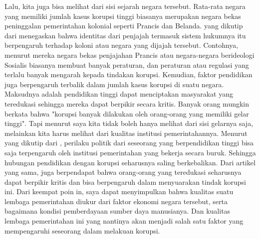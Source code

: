 \documentclass[11pt]{article}
\begin{document}
Lalu, kita juga bisa melihat dari sisi sejarah negara tersebut. Rata-rata negara
yang memiliki jumlah kasus korupsi tinggi biasanya merupakan negara bekas peninggalan
pemerintahan kolonial seperti Prancis dan Belanda. \citet*{laportaQualityGovernment1999}
yang dikutip dari \citet*{svenssonEightQuestionsCorruption2005} menegaskan bahwa 
identitas dari penjajah termasuk sistem hukumnya itu berpengaruh terhadap koloni 
atau negara yang dijajah tersebut. Contohnya, menurut mereka negara bekas penjajahan
Prancis atau negara-negara berideologi Sosialis biasanya membuat banyak peraturan,
dan peraturan atau regulasi yang terlalu banyak mengarah kepada tindakan korupsi. 
Kemudian, faktor pendidikan juga berpengaruh terbalik dalam jumlah kasus korupsi di suatu
negara. Maksudnya adalah pendidikan tinggi dapat menciptakan masyarakat yang
teredukasi sehingga mereka dapat berpikir secara kritis. Banyak orang mungkin berkata
bahwa "korupsi banyak dilakukan oleh orang-orang yang memiliki gelar tinggi". Tapi
menurut saya kita tidak boleh hanya melihat dari sisi gelarnya saja, melainkan 
kita harus melihat dari kualitas institusi pemerintahannya.
Menurut \citet*{vanderbrugErosionPoliticalTrust2007} yang dikutip dari 
\citet*{agerbergCurseKnowledgeEducation2019}, perilaku politik dari seseorang
yang berpendidikan tinggi bisa saja terpengaruh oleh institusi pemerintahan yang
bekerja secara buruk. Sehingga hubungan pendidikan dengan korupsi seharusnya
saling berkebalikan. Dari artikel yang sama, \citeauthor{agerbergCurseKnowledgeEducation2019}
juga berpendapat bahwa orang-orang yang teredukasi seharusnya dapat berpikir kritis 
dan bisa berpengaruh dalam menyuarakan tindak korupsi ini.
Dari keempat poin in, saya dapat menyimpulkan bahwa kualitas suatu
lembaga pemerintahan diukur dari faktor ekonomi negara tersebut, serta bagaimana
kondisi pemberdayaan sumber daya manusianya. Dan kualitas lembaga pemerintahan
ini yang nantinya akan menjadi salah satu faktor yang mempengaruhi seseorang
dalam melakuan korupsi.
\end{document}
